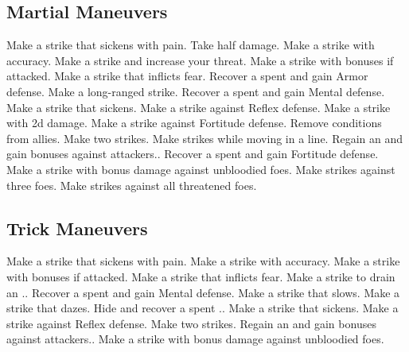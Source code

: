 \subsection{Martial Maneuvers}\label{Martial Maneuvers}
\begin{spelllist}
 Make a strike that sickens with pain.
 Take half damage.
 Make a strike with  accuracy.
 Make a strike and increase your threat.
 Make a strike with bonuses if attacked.
 Make a strike that inflicts fear.
 Recover a spent  and gain  Armor defense.
 Make a long-ranged strike.
 Recover a spent  and gain  Mental defense.
 Make a strike that sickens.
 Make a strike against Reflex defense.
 Make a strike with \plus2d damage.
 Make a strike against Fortitude defense.
 Remove conditions from allies.
 Make two strikes.
 Make strikes while moving in a line.
 Regain an  and gain bonuses against attackers..
 Recover a spent  and gain  Fortitude defense.
 Make a strike with bonus damage against unbloodied foes.
 Make strikes against three foes.
 Make strikes against all threatened foes.
\end{spelllist}



\small
\subsection{Trick Maneuvers}\label{Trick Maneuvers}
\begin{spelllist}
 Make a strike that sickens with pain.
 Make a strike with  accuracy.
 Make a strike with bonuses if attacked.
 Make a strike that inflicts fear.
 Make a strike to drain an ..
 Recover a spent  and gain  Mental defense.
 Make a strike that slows.
 Make a strike that dazes.
 Hide and recover a spent ..
 Make a strike that sickens.
 Make a strike against Reflex defense.
 Make two strikes.
 Regain an  and gain bonuses against attackers..
 Make a strike with bonus damage against unbloodied foes.
\end{spelllist}



